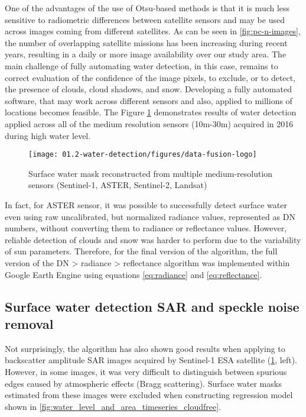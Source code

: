 One of the advantages of the use of Otsu-based methods is that it is much less sensitive to radiometric differences between satellite sensors and may be used across images coming from different satellites. As can be seen in \ref{fig:pc-n-images}, the number of overlapping satellite missions has been increasing during recent years, resulting in a daily or more image availability over our study area. The main challenge of fully automating water detection, in this case, remains to correct evaluation of the confidence of the image pixels, to exclude, or to detect, the presence of clouds, cloud shadows, and snow. Developing a fully automated software, that may work across different sensors and also, applied to millions of locations becomes feasible. The Figure \ref{fig:multiple-sensors} demonstrates results of water detection applied across all of the medium resolution sensors (10m-30m) acquired in 2016 during high water level.

\begin{figure}[H]
	\texttt{[image: 01.2-water-detection/figures/data-fusion-logo]}
	\caption{Surface water mask reconstructed from multiple medium-resolution sensors (Sentinel-1, ASTER, Sentinel-2, Landsat)}
	\label{fig:multiple-sensors}
\end{figure}

In fact, for ASTER sensor, it was possible to successfully detect surface water even using raw uncalibrated, but normalized radiance values, represented as DN numbers, without converting them to radiance or reflectance values. However, reliable detection of clouds and snow was harder to perform due to the variability of sun parameters. Therefore, for the final version of the algorithm, the full version of the DN > radiance > reflectance algorithm was implemented within Google Earth Engine using equations \ref{eq:radiance} and \ref{eq:reflectance}.

\subsection{Surface water detection SAR and speckle noise removal}

Not surprisingly, the algorithm has also shown good results when applying to backscatter amplitude SAR images acquired by Sentinel-1 ESA satellite (\ref{fig:multiple-sensors}, left). However, in some images, it was very difficult to distinguish between spurious edges caused by atmospheric effects (Bragg scattering). Surface water masks estimated from these images were excluded when constructing regression model shown in \ref{fig:water_level_and_area_timeseries_cloudfree}.

